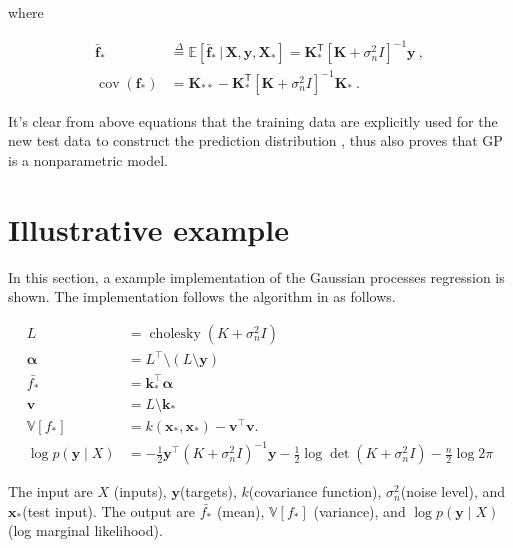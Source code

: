 \documentclass[12pt,letterpaper,fleqn,oneside,titlepage]{offroad-report}
\begin{document}
where 
\begin{ceqn}
    \begin{align}
        \mathbf{\bar{f}_*} &\overset{\Delta}{=} \mathbb{E} [\mathbf{\bar{f}_*} \, \vert \, \mathbf{X}, \mathbf{y}, \mathbf{X}_*] = \mathbf{K}_*^\mathsf{T} [\mathbf{K} + \sigma_n^2{I}]^{-1} \mathbf{y} \ , \nonumber \\
        \operatorname{cov}(\mathbf{f}_*) &= \mathbf{K}_{**} - \mathbf{K}_*^\mathsf{T} [\mathbf{K} + \sigma_n^2{I}]^{-1} \mathbf{K}_* \ . \nonumber
    \end{align}
\end{ceqn}
It's clear from above equations that the training data are explicitly used for the new test data to construct the prediction distribution \cite{snelson2006sparse}, thus also proves that GP is a nonparametric model. 
\section{Illustrative example}

In this section, a example implementation of the Gaussian processes regression is shown. The implementation follows the algorithm in \cite{Rasmussen2006} as follows. 
\begin{ceqn}
    \begin{equation}\label{eqn:Marginals-and-conditionals-of-an-MVN}
      \boxed{\begin{split}
        L &= \operatorname{cholesky}(K + \sigma^2_n I) \\
        \boldsymbol{\alpha} &= L^{\top} \setminus (L \setminus \mathbf{y}) \\
    	\bar{f_{*}} &= \mathbf{k}_{*}^{\top} \boldsymbol{\alpha} \\
    	\mathbf{v} &= L \setminus \mathbf{k}_{*} \\
    	\mathbb{V}[f_{*}] &= k(\mathbf{x}_{*}, \mathbf{x}_{*}) - \mathbf{v}^{\top} \mathbf{v}.\\ 
    	\log p(\mathbf{y} \mid X) &= -\frac{1}{2} \mathbf{y}^{\top} (K + \sigma_n^2 I)^{-1} \mathbf{y} - \frac{1}{2} \log \det(K + \sigma_n^2 I) - \frac{n}{2} \log 2 \pi \nonumber 
      \end{split}}
    \end{equation}
\end{ceqn}
The input are $X$ (inputs), $\mathbf{y}$(targets), $k$(covariance function), $\sigma^2_n$(noise level), and $\mathbf{x_{*}}$(test input). The output are $\bar{f_{*}}$ (mean), $\mathbb{V}[f_{*}]$ (variance), and $\log p(\mathbf{y} \mid X)$ (log marginal likelihood). 
\end{document}
